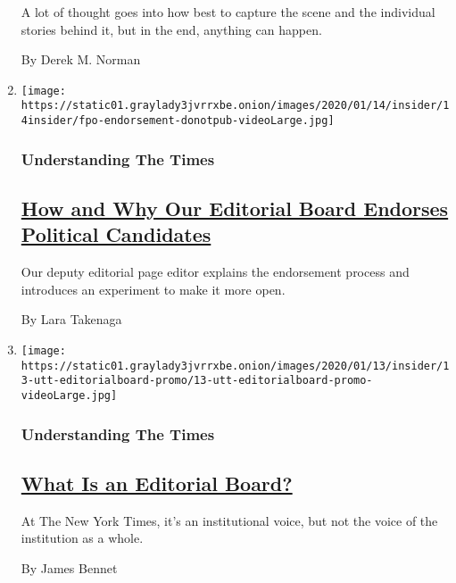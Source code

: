 \begin{enumerate}
  A lot of thought goes into how best to capture the scene and the
  individual stories behind it, but in the end, anything can happen.

  By Derek M. Norman
\item
  \texttt{[image: https://static01.graylady3jvrrxbe.onion/images/2020/01/14/insider/14insider/fpo-endorsement-donotpub-videoLarge.jpg]}

  \hypertarget{understanding-the-times-1}{%
  \subsubsection{Understanding The
  Times}\label{understanding-the-times-1}}

  \hypertarget{how-and-why-our-editorial-board-endorses-political-candidates}{%
  \subsection{\texorpdfstring{\href{/2020/01/13/reader-center/political-endorsements.html}{How
  and Why Our Editorial Board Endorses Political
  Candidates}}{How and Why Our Editorial Board Endorses Political Candidates}}\label{how-and-why-our-editorial-board-endorses-political-candidates}}

  Our deputy editorial page editor explains the endorsement process and
  introduces an experiment to make it more open.

  By Lara Takenaga
\item
  \texttt{[image: https://static01.graylady3jvrrxbe.onion/images/2020/01/13/insider/13-utt-editorialboard-promo/13-utt-editorialboard-promo-videoLarge.jpg]}

  \hypertarget{understanding-the-times-2}{%
  \subsubsection{Understanding The
  Times}\label{understanding-the-times-2}}

  \hypertarget{what-is-an-editorial-board}{%
  \subsection{\texorpdfstring{\href{/2020/01/13/reader-center/editorial-board-explainer.html}{What
  Is an Editorial
  Board?}}{What Is an Editorial Board?}}\label{what-is-an-editorial-board}}

  At The New York Times, it's an institutional voice, but not the voice
  of the institution as a whole.

  By James Bennet
\end{enumerate}

